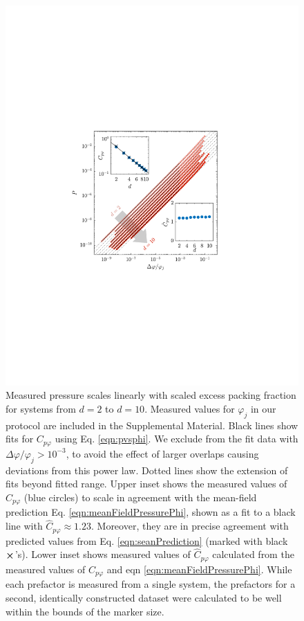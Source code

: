 %
\begin{figure}[t]
\includegraphics[width=\columnwidth, trim=140 241 169 261, clip]{excessContactsScaling/pvsphiSub.pdf}
\caption{Measured pressure scales linearly with scaled excess packing fraction for systems from $d=2$ to $d=10$. Measured values for $\varphi_j$ in our protocol are included in the Supplemental Material. Black lines show fits for $C_{p\varphi}$ using Eq. \ref{eqn:pvsphi}. We exclude from the fit data with $\Delta\varphi/\varphi_j>10^{-3}$, to avoid the effect of larger overlaps causing deviations from this power law. Dotted lines show the extension of fits beyond fitted range. Upper inset shows the measured values of $C_{p\varphi}$ (blue circles) to scale in agreement with the mean-field prediction Eq. \ref{eqn:meanFieldPressurePhi}, shown as a fit to a black line with $\hat{C}_{p\varphi} \approx 1.23$. Moreover, they are in precise agreement with predicted values from Eq. \ref{eqn:seanPrediction} (marked with black $\boldsymbol\times$'s). Lower inset shows measured values of $\hat{C}_{p\varphi}$ calculated from the measured values of $C_{p\varphi}$ and eqn \ref{eqn:meanFieldPressurePhi}. While each prefactor is measured from a single system, the prefactors for a second, identically constructed dataset were calculated to be well within the bounds of the marker size.}
\label{plot:pvsphi}
\end{figure}
